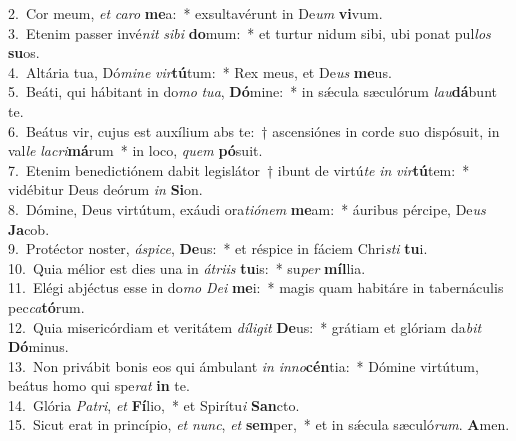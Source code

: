 {2.~}Cor meum, \textit{et} \textit{ca}\textit{ro} \textbf{me}a:~* exsultavérunt in De\textit{um} \textbf{vi}vum.\\
{3.~}Etenim passer invé\textit{nit} \textit{si}\textit{bi} \textbf{do}mum:~* et turtur nidum sibi, ubi ponat pul\textit{los} \textbf{su}os.\\
{4.~}Altária tua, Dó\textit{mi}\textit{ne} \textit{vir}\textbf{tú}tum:~* Rex meus, et De\textit{us} \textbf{me}us.\\
{5.~}Beáti, qui hábitant in do\textit{mo} \textit{tu}\textit{a}, \textbf{Dó}mine:~* in sǽcula sæculórum \textit{lau}\textbf{dá}bunt te.\\
{6.~}Beátus vir, cujus est auxílium abs te:~† ascensiónes in corde suo dispósuit, in val\textit{le} \textit{la}\textit{cri}\textbf{má}rum~* in loco, \textit{quem} \textbf{pó}suit.\\
{7.~}Etenim benedictiónem dabit legislátor~† ibunt de virtú\textit{te} \textit{in} \textit{vir}\textbf{tú}tem:~* vidébitur Deus deórum \textit{in} \textbf{Si}on.\\
{8.~}Dómine, Deus virtútum, exáudi ora\textit{ti}\textit{ó}\textit{nem} \textbf{me}am:~* áuribus pércipe, De\textit{us} \textbf{Ja}cob.\\
{9.~}Protéctor noster, \textit{á}\textit{spi}\textit{ce}, \textbf{De}us:~* et réspice in fáciem Chri\textit{sti} \textbf{tu}i.\\
{10.~}Quia mélior est dies una in \textit{á}\textit{tri}\textit{is} \textbf{tu}is:~* su\textit{per} \textbf{míl}lia.\\
{11.~}Elégi abjéctus esse in do\textit{mo} \textit{De}\textit{i} \textbf{me}i:~* magis quam habitáre in tabernáculis pec\textit{ca}\textbf{tó}rum.\\
{12.~}Quia misericórdiam et veritátem \textit{dí}\textit{li}\textit{git} \textbf{De}us:~* grátiam et glóriam da\textit{bit} \textbf{Dó}minus.\\
{13.~}Non privábit bonis eos qui ámbulant \textit{in} \textit{in}\textit{no}\textbf{cén}tia:~* Dómine virtútum, beátus homo qui spe\textit{rat} \textbf{in} te.\\
{14.~}Glória \textit{Pa}\textit{tri}, \textit{et} \textbf{Fí}lio,~* et Spirítu\textit{i} \textbf{San}cto.\\
{15.~}Sicut erat in princípio, \textit{et} \textit{nunc}, \textit{et} \textbf{sem}per,~* et in sǽcula sæculó\textit{rum}. \textbf{A}men.\\
